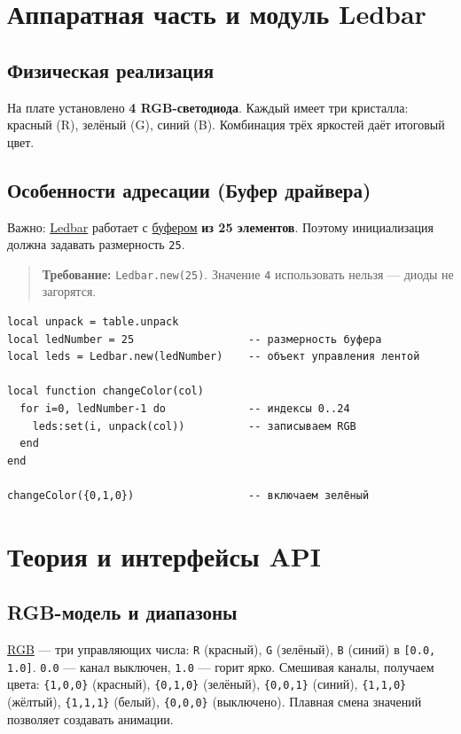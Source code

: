 \documentclass[a4paper,12pt]{article}
\begin{document}
\section{Аппаратная часть и модуль Ledbar}
\subsection{Физическая реализация}
На плате установлено \textbf{4 RGB-светодиода}. Каждый имеет три кристалла: красный (R), зелёный (G), синий (B). Комбинация трёх яркостей даёт итоговый цвет.

\subsection{Особенности адресации (Буфер драйвера)}
Важно: \hyperlink{term:ledbar}{Ledbar} работает с \hyperlink{term:buffer}{буфером} \textbf{из 25 элементов}. Поэтому инициализация должна задавать размерность \verb|25|.
\begin{quote}
\textbf{Требование:} \verb|Ledbar.new(25)|. Значение \verb|4| использовать нельзя — диоды не загорятся.
\end{quote}
\begin{lstlisting}[style=lua,caption={Инициализация и установка зелёного цвета}]
local unpack = table.unpack
local ledNumber = 25                  -- размерность буфера
local leds = Ledbar.new(ledNumber)    -- объект управления лентой

local function changeColor(col)
  for i=0, ledNumber-1 do             -- индексы 0..24
    leds:set(i, unpack(col))          -- записываем RGB
  end
end

changeColor({0,1,0})                  -- включаем зелёный
\end{lstlisting}

\section{Теория и интерфейсы API}
\subsection{RGB-модель и диапазоны}
\hyperlink{term:rgb}{RGB} — три управляющих числа: \verb|R| (красный), \verb|G| (зелёный), \verb|B| (синий) в \verb|[0.0, 1.0]|. \verb|0.0| — канал выключен, \verb|1.0| — горит ярко. Смешивая каналы, получаем цвета: \verb|{1,0,0}| (красный), \verb|{0,1,0}| (зелёный), \verb|{0,0,1}| (синий), \verb|{1,1,0}| (жёлтый), \verb|{1,1,1}| (белый), \verb|{0,0,0}| (выключено). Плавная смена значений позволяет создавать анимации.
\end{document}
